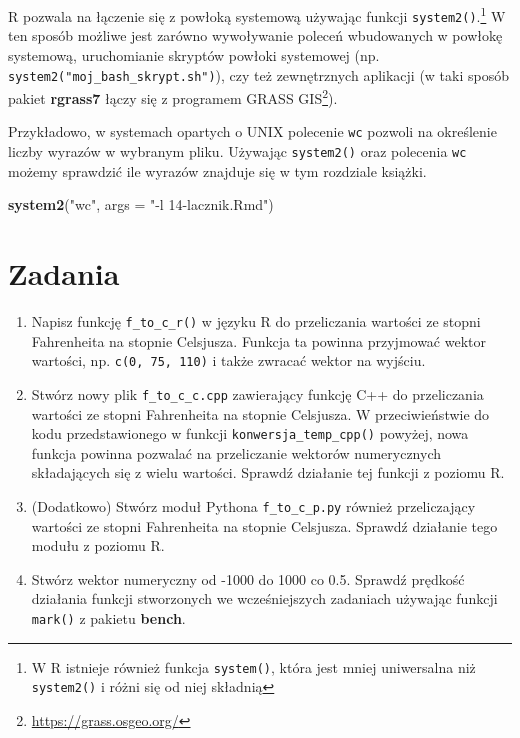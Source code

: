 \documentclass[paper=6in:9in,pagesize=pdftex,headinclude=on,footinclude=on,10pt]{scrbook}
\newenvironment{Shaded}{\begin{snugshade}}{\end{snugshade}}
\newcommand{\DataTypeTok}[1]{\textcolor[rgb]{0.13,0.29,0.53}{#1}}
\newcommand{\KeywordTok}[1]{\textcolor[rgb]{0.13,0.29,0.53}{\textbf{#1}}}
\newcommand{\NormalTok}[1]{#1}
\newcommand{\StringTok}[1]{\textcolor[rgb]{0.31,0.60,0.02}{#1}}
\DeclareRobustCommand{\href}[2]{#2\footnote{\url{#1}}}
\providecommand{\tightlist}{%
  \setlength{\itemsep}{0pt}\setlength{\parskip}{0pt}}
\begin{document}
R pozwala na łączenie się z powłoką systemową używając funkcji \texttt{system2()}.\footnote{W R istnieje również funkcja \texttt{system()}, która jest mniej uniwersalna niż \texttt{system2()} i różni się od niej składnią}
W ten sposób możliwe jest zarówno wywoływanie poleceń wbudowanych w powłokę systemową, uruchomianie skryptów powłoki systemowej (np. \texttt{system2("moj\_bash\_skrypt.sh")}), czy też zewnętrznych aplikacji (w taki sposób pakiet \textbf{rgrass7} \citep{R-rgrass7} łączy się z programem \href{https://grass.osgeo.org/}{GRASS GIS}).

Przykładowo, w systemach opartych o UNIX polecenie \texttt{wc} pozwoli na określenie liczby wyrazów w wybranym pliku.
Używając \texttt{system2()} oraz polecenia \texttt{wc} możemy sprawdzić ile wyrazów znajduje się w tym rozdziale książki.

\begin{Shaded}
\begin{Highlighting}[]
\KeywordTok{system2}\NormalTok{(}\StringTok{"wc"}\NormalTok{, }\DataTypeTok{args =} \StringTok{"-l 14-lacznik.Rmd"}\NormalTok{)}
\end{Highlighting}
\end{Shaded}

\hypertarget{zadania}{%
\section{Zadania}\label{zadania}}

\begin{enumerate}
\def\labelenumi{\arabic{enumi}.}
\tightlist
\item
  Napisz funkcję \texttt{f\_to\_c\_r()} w języku R do przeliczania wartości ze stopni Fahrenheita na stopnie Celsjusza.
  Funkcja ta powinna przyjmować wektor wartości, np. \texttt{c(0,\ 75,\ 110)} i także zwracać wektor na wyjściu.
\item
  Stwórz nowy plik \texttt{f\_to\_c\_c.cpp} zawierający funkcję C++ do przeliczania wartości ze stopni Fahrenheita na stopnie Celsjusza.
  W przeciwieństwie do kodu przedstawionego w funkcji \texttt{konwersja\_temp\_cpp()} powyżej, nowa funkcja powinna pozwalać na przeliczanie wektorów numerycznych składających się z wielu wartości.
  Sprawdź działanie tej funkcji z poziomu R.
\item
  (Dodatkowo) Stwórz moduł Pythona \texttt{f\_to\_c\_p.py} również przeliczający wartości ze stopni Fahrenheita na stopnie Celsjusza.
  Sprawdź działanie tego modułu z poziomu R.
\item
  Stwórz wektor numeryczny od -1000 do 1000 co 0.5.
  Sprawdź prędkość działania funkcji stworzonych we wcześniejszych zadaniach używając funkcji \texttt{mark()} z pakietu \textbf{bench}.
\end{enumerate}
\end{document}
